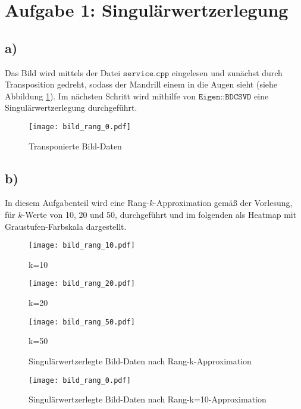 



\maketitle

\section*{Aufgabe 1: Singulärwertzerlegung}
\subsection*{a)}
Das Bild wird mittels der Datei $\texttt{service.cpp}$ eingelesen und
zunächst durch Transposition gedreht, sodass der Mandrill einem in die Augen
sieht (siehe Abbildung \ref{fig:1a}). Im nächsten Schritt wird mithilfe von
$\texttt{Eigen::BDCSVD}$ eine Singulärwertzerlegung durchgeführt.

\begin{figure}[h]
    \centering
    \texttt{[image: bild\_rang\_0.pdf]}
    \caption{Transponierte Bild-Daten}
    \label{fig:1a}
\end{figure}

\subsection*{b)}
In diesem Aufgabenteil wird eine Rang-$k$-Approximation gemäß der Vorlesung,
für $k$-Werte von  10, 20 und 50, durchgeführt und im folgenden als Heatmap mit
Graustufen-Farbskala dargestellt.

\begin{figure}[!htb]
\texttt{[image: bild\_rang\_10.pdf]}
\caption*{k=10}
\label{fig:1b_10}
\endminipage\hfill
{}
\texttt{[image: bild\_rang\_20.pdf]}
\caption*{k=20}
\label{fig:1b_20}
\endminipage\hfill
{}%
\texttt{[image: bild\_rang\_50.pdf]}
\caption*{k=50}
\label{fig:1b_50}
\endminipage
\caption{Singulärwertzerlegte Bild-Daten nach Rang-k-Approximation}
\end{figure}

\begin{figure}[h]
    \centering
    \texttt{[image: bild\_rang\_0.pdf]}
    \caption{Singulärwertzerlegte Bild-Daten nach Rang-k=10-Approximation}
    \label{fig:1b_10}
\end{figure}

